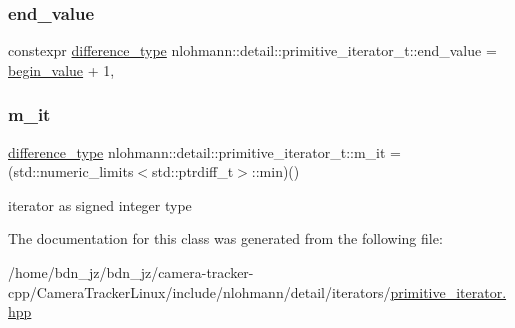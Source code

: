 \subsubsection{\texorpdfstring{end\+\_\+value}{end\_value}}
{\footnotesize\ttfamily constexpr \hyperlink{classnlohmann_1_1detail_1_1primitive__iterator__t_af3db0d5c90de427d51645fe73a015553}{difference\+\_\+type} nlohmann\+::detail\+::primitive\+\_\+iterator\+\_\+t\+::end\+\_\+value = \hyperlink{classnlohmann_1_1detail_1_1primitive__iterator__t_afcb3bcf9da8aa95bd82067d1a67c2326}{begin\+\_\+value} + 1\hspace{0.3cm}{\ttfamily [static]}, {\ttfamily [private]}}

\mbox{\label{classnlohmann_1_1detail_1_1primitive__iterator__t_a4357355113b0cd7e12b15c2e93703510}} 
\subsubsection{\texorpdfstring{m\+\_\+it}{m\_it}}
{\footnotesize\ttfamily \hyperlink{classnlohmann_1_1detail_1_1primitive__iterator__t_af3db0d5c90de427d51645fe73a015553}{difference\+\_\+type} nlohmann\+::detail\+::primitive\+\_\+iterator\+\_\+t\+::m\+\_\+it = (std\+::numeric\+\_\+limits$<$std\+::ptrdiff\+\_\+t$>$\+::min)()\hspace{0.3cm}{\ttfamily [private]}}



iterator as signed integer type 



The documentation for this class was generated from the following file\+:\begin{DoxyCompactItemize}
\item 
/home/bdn\+\_\+jz/bdn\+\_\+jz/camera-\/tracker-\/cpp/\+Camera\+Tracker\+Linux/include/nlohmann/detail/iterators/\hyperlink{primitive__iterator_8hpp}{primitive\+\_\+iterator.\+hpp}\end{DoxyCompactItemize}
